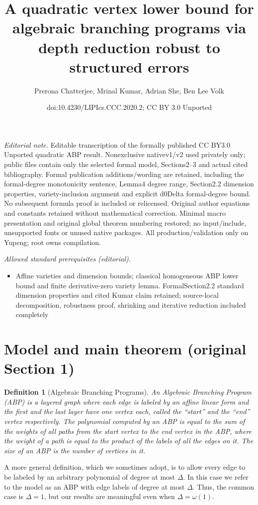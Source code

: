 \documentclass[10pt,a4paper]{article}
\title{A quadratic vertex lower bound for algebraic branching programs via depth reduction robust to structured errors}
\author{Prerona Chatterjee, Mrinal Kumar, Adrian She, Ben Lee Volk}
\date{doi:10.4230/LIPIcs.CCC.2020.2; CC BY 3.0 Unported}
\newtheorem{definition}[theorem]{Definition}
\begin{document}
\maketitle
\noindent\textit{Editorial note.} Editable transcription of the formally published CC BY3.0 Unported quadratic ABP result. Nonexclusive nativev1/v2 used privately only; public files contain only the selected formal model, Sections2–3 and actual cited bibliography. Formal publication additions/wording are retained, including the formal-degree monotonicity sentence, Lemma4 degree range, Section2.2 dimension properties, variety-inclusion argument and explicit d0Delta formal-degree bound. No subsequent formula proof is included or relicensed. Original author equations and constants retained without mathematical correction. Minimal macro presentation and original global theorem numbering restored; no input/include, unsupported fonts or unused native packages. All production/validation only on Yupeng; root owns compilation.\par\medskip
\noindent\textit{Allowed standard prerequisites (editorial).}\begin{itemize}
\item Affine varieties and dimension bounds; classical homogeneous ABP lower bound and finite derivative-zero variety lemma. FormalSection2.2 standard dimension properties and cited Kumar claim retained; source-local decomposition, robustness proof, shrinking and iterative reduction included completely
\end{itemize}\medskip
\section*{Model and main theorem (original Section 1)}
\begin{definition}[Algebraic Branching Programs]\label{def:abp}
An Algebraic Branching Program (ABP) is a layered graph where each edge is labeled by an affine linear form and the first and the last layer have one vertex each, called the ``start'' and the ``end'' vertex respectively.
The polynomial computed by an ABP is equal to the sum of the weights of all paths from the start vertex to the end vertex in the ABP, where the weight of a path is equal to the product of the labels of all the edges on it.
The size of an ABP is the number of vertices in it.
\end{definition}
A more general definition, which we sometimes adopt, is to allow every edge to be labeled by an arbitrary polynomial of degree at most $\Delta$. In this case we refer to the model as an ABP with edge labels of degree at most $\Delta$. Thus, the common case is $\Delta=1$, but our results are meaningful even when $\Delta=\omega(1)$.
\end{document}
